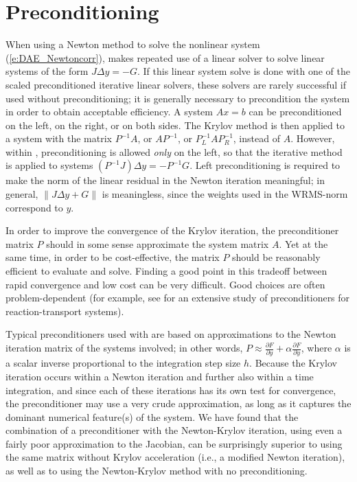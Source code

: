 \section{Preconditioning}\label{s:preconditioning}
When using a Newton method to solve the nonlinear system (\ref{e:DAE_Newtoncorr}),
{\idas} makes repeated use of a linear solver to solve linear systems of the form
$J \Delta y = - G$.
If this linear system solve is done with one of the scaled preconditioned iterative 
linear solvers, these solvers are rarely successful if used without preconditioning;
it is generally necessary to precondition the system in order to obtain acceptable efficiency.  
A system $A x = b$ can be preconditioned on the left, on the right,
or on both sides. The Krylov method is then applied to a system with the matrix $P^{-1}A$, 
or $AP^{-1}$, or $P_L^{-1} A P_R^{-1}$, instead of $A$.  
However, within {\idas}, preconditioning is allowed {\em only} on the left,
so that the iterative method is applied to systems $(P^{-1}J)\Delta y = -P^{-1}G$.  
Left preconditioning is required to make the norm of the linear residual in the Newton 
iteration meaningful; in general, $\| J \Delta y + G \|$ is meaningless, since the 
weights used in the WRMS-norm correspond to $y$.

In order to improve the convergence of the Krylov iteration, the preconditioner matrix 
$P$ should in some sense approximate the system matrix $A$.  
Yet at the same time, in order to be cost-effective, the matrix $P$ should
be reasonably efficient to evaluate and solve.  Finding a good point
in this tradeoff between rapid convergence and low cost can be very
difficult.  Good choices are often problem-dependent (for example, see
\cite{BrHi:89} for an extensive study of preconditioners for
reaction-transport systems).

Typical preconditioners used with {\idas} are based on approximations to the Newton 
iteration matrix of the systems involved; in other words, 
$P \approx \frac{\partial F}{\partial y} + \alpha\frac{\partial F}{\partial \dot y}$,
where $\alpha$ is a scalar inverse proportional to the integration step size $h$.
Because the Krylov iteration occurs within a Newton iteration and further
also within a time integration, and since each of these iterations has
its own test for convergence, the preconditioner may use a very crude
approximation, as long as it captures the dominant numerical
feature(s) of the system.  We have found that the combination of a
preconditioner with the Newton-Krylov iteration, using even a fairly
poor approximation to the Jacobian, can be surprisingly superior to
using the same matrix without Krylov acceleration (i.e., a modified
Newton iteration), as well as to using the Newton-Krylov method with
no preconditioning.

